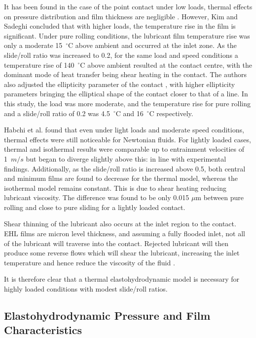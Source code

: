 It has been found in the case of the point contact under low loads, thermal effects on pressure distribution and film thickness are negligible \cite{ZhuDong1984}. However, Kim and Sadeghi \cite{Kim1993} concluded that with higher loads, the temperature rise in the film is significant. Under pure rolling conditions, the lubricant film temperature rise was only a moderate 15~${ }^{\circ}\mathrm{C}$ above ambient and occurred at the inlet zone. As the slide/roll ratio was increased to 0.2, for the same load and speed conditions a temperature rise of 140~${ }^{\circ}\mathrm{C}$ above ambient resulted at the contact centre, with the dominant mode of heat transfer being shear heating in the contact. The authors also adjusted the ellipticity parameter of the contact \cite{Kim1993a}, with higher ellipticity parameters bringing the elliptical shape of the contact closer to that of a line. In this study, the load was more moderate, and the temperature rise for pure rolling and a slide/roll ratio of 0.2 was 4.5~${ }^{\circ}\mathrm{C}$ and 16~${ }^{\circ}\mathrm{C}$ respectively.

Habchi et al. \cite{Habchi2008} found that even under light loads and moderate speed conditions, thermal effects were still noticeable for Newtonian fluids. For lightly loaded cases, thermal and isothermal results were comparable up to entrainment velocities of 1~$m/s$ but began to diverge slightly above this: in line with experimental findings. Additionally, as the slide/roll ratio is increased above 0.5, both central and minimum films are found to decrease for the thermal model, whereas the isothermal model remains constant. This is due to shear heating reducing lubricant viscosity. The difference was found to be only 0.015 $\mu \mathrm{m}$ between pure rolling and close to pure sliding for a lightly loaded contact.

Shear thinning of the lubricant also occurs at the inlet region to the contact. EHL films are micron level thickness, and assuming a fully flooded inlet, not all of the lubricant will traverse into the contact. Rejected lubricant will then produce some reverse flows which will shear the lubricant, increasing the inlet temperature and hence reduce the viscosity of the fluid \cite{Stribeck1907}.

It is therefore clear that a thermal elastohydrodynamic model is necessary for highly loaded conditions with modest slide/roll ratios.

\subsection{Elastohydrodynamic Pressure and Film Characteristics}

